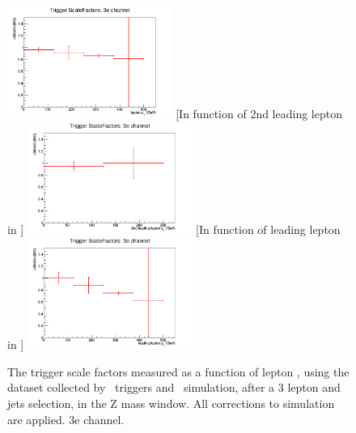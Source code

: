 \begin{figure}[tb]
	[In function of lepton \pt]{
		\includegraphics[width=0.48\textwidth]{Appendix/Figures/trigger/ScaleFactors/3e/SF_trigger_3ehistPt.png}
		\label{image:3ehistPt.png}
	}
	[In function of 2nd leading lepton in \pt]{
		\includegraphics[width=0.48\textwidth]{Appendix/Figures/trigger/ScaleFactors/3e/SF_trigger_3ehistPt_2ndleadinglep.png}
		\label{image:3ehistPt_2ndleadinglep.png}
	}
	[In function of leading lepton in \pt]{
		\includegraphics[width=0.48\textwidth]{Appendix/Figures/trigger/ScaleFactors/3e/SF_trigger_3ehistPt_leadinglep.png}
		\label{image:3ehistPt_leadinglep.png}
	}
	\caption{The trigger scale factors measured as a function of lepton \pt, using the dataset collected by \Etmis\ triggers and \WZ\ simulation, after a 3 lepton and jets selection, in the Z mass window. All corrections to simulation are applied. 3e channel.}
	\label{image:FigurestriggerScaleFactors3e}
\end{figure}

